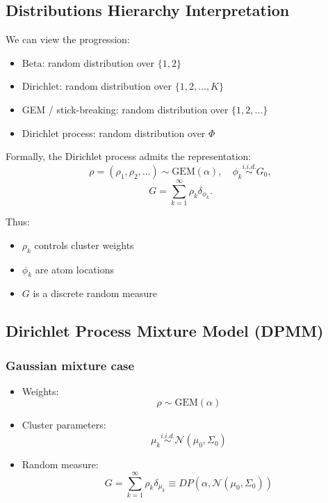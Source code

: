 \documentclass[12pt,oneside]{book}
\numberwithin{equation}{section}
\theoremstyle{definition}
\theoremstyle{plain}
\theoremstyle{remark}
\begin{document}
\subsection*{Distributions Hierarchy Interpretation}

We can view the progression:

\begin{itemize}
\item $\mathrm{Beta}$: random distribution over $\{1,2\}$
\item $\mathrm{Dirichlet}$: random distribution over $\{1,2,\dots,K\}$
\item GEM / stick-breaking: random distribution over $\{1,2,\dots\}$
\item Dirichlet process: random distribution over $\Phi$
\end{itemize}

Formally, the Dirichlet process admits the representation:
\[
\rho = (\rho_1, \rho_2, \dots) \sim \mathrm{GEM}(\alpha),
\quad
\phi_k \overset{i.i.d.}{\sim} G_0,
\]
\[
G = \sum_{k=1}^{\infty} \rho_k \delta_{\phi_k}.
\]

Thus:
\begin{itemize}
\item $\rho_k$ controls cluster weights
\item $\phi_k$ are atom locations
\item $G$ is a discrete random measure
\end{itemize}

\subsection{Dirichlet Process Mixture Model (DPMM)}

\subsubsection*{Gaussian mixture case}

\begin{itemize}
\item Weights:
\[
\rho \sim \mathrm{GEM}(\alpha)
\]

\item Cluster parameters:
\[
\mu_k \overset{i.i.d.}{\sim} \mathcal{N}(\mu_0, \Sigma_0)
\]

\item Random measure:
\[
G = \sum_{k=1}^{\infty} \rho_k \delta_{\mu_k} \equiv DP(\alpha, \mathcal{N}(\mu_0,\Sigma_0))
\]
\end{itemize}
\end{document}
